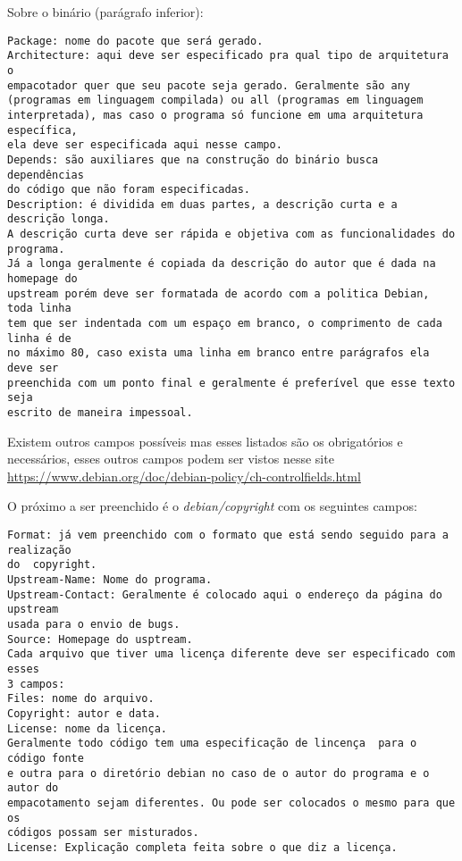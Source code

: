 Sobre o binário (parágrafo inferior):
\begin{verbatim}
Package: nome do pacote que será gerado.
Architecture: aqui deve ser especificado pra qual tipo de arquitetura o 
empacotador quer que seu pacote seja gerado. Geralmente são any 
(programas em linguagem compilada) ou all (programas em linguagem 
interpretada), mas caso o programa só funcione em uma arquitetura específica,
ela deve ser especificada aqui nesse campo.
Depends: são auxiliares que na construção do binário busca dependências
do código que não foram especificadas. 
Description: é dividida em duas partes, a descrição curta e a descrição longa.
A descrição curta deve ser rápida e objetiva com as funcionalidades do programa.
Já a longa geralmente é copiada da descrição do autor que é dada na homepage do
upstream porém deve ser formatada de acordo com a politica Debian, toda linha 
tem que ser indentada com um espaço em branco, o comprimento de cada linha é de
no máximo 80, caso exista uma linha em branco entre parágrafos ela deve ser
preenchida com um ponto final e geralmente é preferível que esse texto seja
escrito de maneira impessoal.
\end{verbatim}

Existem outros campos possíveis mas esses listados são os obrigatórios e necessários, esses outros campos podem ser vistos nesse site \url{https://www.debian.org/doc/debian-policy/ch-controlfields.html}

O próximo a ser preenchido é o \textit{debian/copyright} com os seguintes campos:
\begin{verbatim}
Format: já vem preenchido com o formato que está sendo seguido para a realização
do  copyright.
Upstream-Name: Nome do programa.
Upstream-Contact: Geralmente é colocado aqui o endereço da página do upstream
usada para o envio de bugs.
Source: Homepage do usptream.
Cada arquivo que tiver uma licença diferente deve ser especificado com esses
3 campos:
Files: nome do arquivo.
Copyright: autor e data.
License: nome da licença.
Geralmente todo código tem uma especificação de lincença  para o código fonte
e outra para o diretório debian no caso de o autor do programa e o autor do
empacotamento sejam diferentes. Ou pode ser colocados o mesmo para que os 
códigos possam ser misturados.
License: Explicação completa feita sobre o que diz a licença. 
\end{verbatim}

